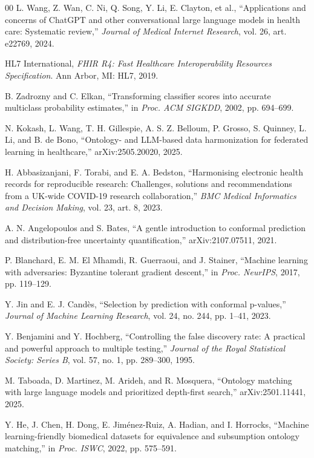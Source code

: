 \documentclass[conference]{IEEEtran}
\begin{document}
\begin{thebibliography}{00}
 L. Wang, Z. Wan, C. Ni, Q. Song, Y. Li, E. Clayton, et al., ``Applications and concerns of ChatGPT and other conversational large language models in health care: Systematic review,'' \emph{Journal of Medical Internet Research}, vol. 26, art. e22769, 2024.

 HL7 International, \emph{FHIR R4: Fast Healthcare Interoperability Resources Specification}. Ann Arbor, MI: HL7, 2019.

 B. Zadrozny and C. Elkan, ``Transforming classifier scores into accurate multiclass probability estimates,'' in \emph{Proc. ACM SIGKDD}, 2002, pp. 694--699.

 N. Kokash, L. Wang, T. H. Gillespie, A. S. Z. Belloum, P. Grosso, S. Quinney, L. Li, and B. de Bono, ``Ontology- and LLM-based data harmonization for federated learning in healthcare,'' arXiv:2505.20020, 2025.

 H. Abbasizanjani, F. Torabi, and E. A. Bedston, ``Harmonising electronic health records for reproducible research: Challenges, solutions and recommendations from a UK-wide COVID-19 research collaboration,'' \emph{BMC Medical Informatics and Decision Making}, vol. 23, art. 8, 2023.

 A. N. Angelopoulos and S. Bates, ``A gentle introduction to conformal prediction and distribution-free uncertainty quantification,'' arXiv:2107.07511, 2021.

 P. Blanchard, E. M. El Mhamdi, R. Guerraoui, and J. Stainer, ``Machine learning with adversaries: Byzantine tolerant gradient descent,'' in \emph{Proc. NeurIPS}, 2017, pp. 119--129.

 Y. Jin and E. J. Cand\`es, ``Selection by prediction with conformal p-values,'' \emph{Journal of Machine Learning Research}, vol. 24, no. 244, pp. 1--41, 2023.

 Y. Benjamini and Y. Hochberg, ``Controlling the false discovery rate: A practical and powerful approach to multiple testing,'' \emph{Journal of the Royal Statistical Society: Series B}, vol. 57, no. 1, pp. 289--300, 1995.

 M. Taboada, D. Martinez, M. Arideh, and R. Mosquera, ``Ontology matching with large language models and prioritized depth-first search,'' arXiv:2501.11441, 2025.

 Y. He, J. Chen, H. Dong, E. Jim\'enez-Ruiz, A. Hadian, and I. Horrocks, ``Machine learning-friendly biomedical datasets for equivalence and subsumption ontology matching,'' in \emph{Proc. ISWC}, 2022, pp. 575--591.


\end{thebibliography}
\end{document}
